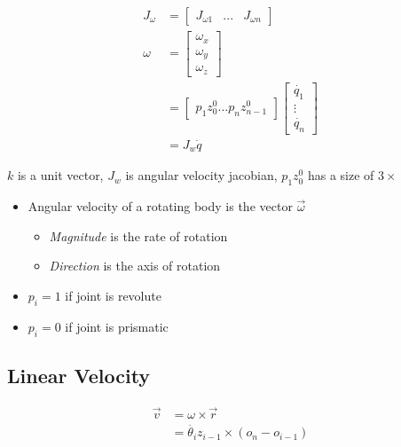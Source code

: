    \begin{align}
      J_{\omega} &=
        \begin{bmatrix}
          J_{\omega 1} & ... & J_{\omega n}
        \end{bmatrix}  \\
      \omega
        &=
        \begin{bmatrix}
          \omega_{x} \\
          \omega_{y} \\
          \omega_{z}
        \end{bmatrix} \\
        &=
        \begin{bmatrix}
          p_{1} z^{0}_{0} ... p_{n} z^{0}_{n - 1}
        \end{bmatrix}
        \begin{bmatrix}
          \dot{q_{1}} \\
          \vdots \\
          \dot{q_{n}}
        \end{bmatrix} \\
        &= J_{w} \dot{q}
    \end{align}

    $ k $ is a unit vector, $ J_{w} $ is angular velocity jacobian,
    $ p_{1} z^{0}_{0} $ has a size of $ 3 \times $

    \begin{itemize}
      \item Angular velocity of a rotating body is the vector $ \vec{\omega} $
      \begin{itemize}
        \item \emph{Magnitude} is the rate of rotation
        \item \emph{Direction} is the axis of rotation
      \end{itemize}

      \item $ p_{i} = 1 $ if joint is revolute
      \item $ p_{i} = 0 $ if joint is prismatic
    \end{itemize}

  \subsection{Linear Velocity}

    \begin{align}
      \vec{v}
        &= \omega \times \vec{r} \\
        &= \dot{\theta_{i}} z_{i - 1} \times \left( o_{n} - o_{i - 1} \right)
    \end{align}


